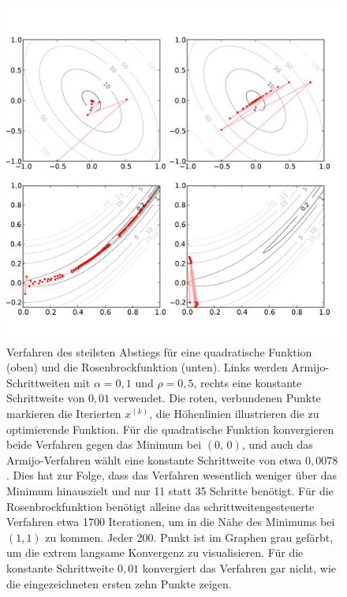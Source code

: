 \begin{figure}
  \centering
  \includegraphics[width=\textwidth]{plots/steepestdescent}
  \caption{Verfahren des steilsten Abstiegs für eine quadratische
    Funktion (oben) und die Rosenbrockfunktion (unten). Links werden
    Armijo-Schrittweiten mit $\alpha=0,1$ und $\rho=0,5$, rechts eine
    konstante Schrittweite von $0,01$ verwendet. Die roten,
    verbundenen Punkte markieren die Iterierten $x^{(k)}$, die
    Höhenlinien illustrieren die zu optimierende Funktion. Für die
    quadratische Funktion konvergieren beide Verfahren gegen das
    Minimum bei $(0,\,0)$, und auch das Armijo-Verfahren wählt eine
    konstante Schrittweite von etwa $0,0078$. Dies hat zur Folge, dass
    das Verfahren wesentlich weniger über das Minimum hinauszielt und
    nur 11 statt 35 Schritte benötigt. Für die Rosenbrockfunktion
    benötigt alleine das schrittweitengesteuerte Verfahren etwa 1700
    Iterationen, um in die Nähe des Minimums bei $(1,1)$ zu kommen.  Jeder
    200. Punkt ist im Graphen grau gefärbt, um die extrem langsame
    Konvergenz zu visualisieren. Für die konstante Schrittweite $0,01$
    konvergiert das Verfahren gar nicht, wie die
    eingezeichneten ersten zehn Punkte zeigen.} \label{fig:armijo}
\end{figure}

